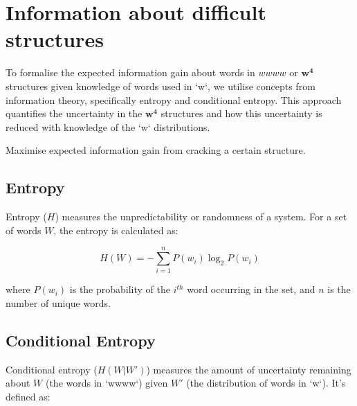 \section{Information about difficult structures}
\begin{center}
\end{center}

To formalise the expected information gain about words in $wwww$ or $\bm{w^4}$ structures given knowledge of words used in `w`, we utilise concepts from information theory, specifically entropy and conditional entropy. This approach quantifies the uncertainty in the $\bm{w^4}$ structures and how this uncertainty is reduced with knowledge of the `w` distributions.

Maximise expected information gain from cracking a certain structure.

\subsection*{Entropy}

Entropy (\(H\)) measures the unpredictability or randomness of a system. For a set of words \(W\), the entropy is calculated as:

\[
H(W) = -\sum_{i=1}^{n} P(w_i) \log_2 P(w_i)
\]

where \(P(w_i)\) is the probability of the \(i^{th}\) word occurring in the set, and \(n\) is the number of unique words.

\subsection*{Conditional Entropy}

Conditional entropy (\(H(W|W')\)) measures the amount of uncertainty remaining about \(W\) (the words in `wwww`) given \(W'\) (the distribution of words in `w`). It's defined as:


